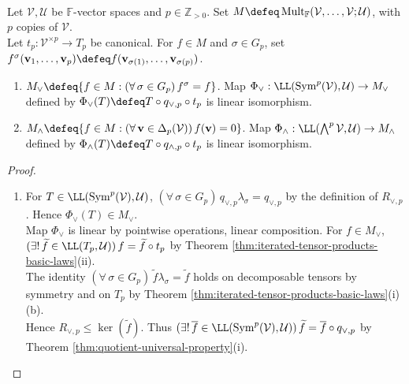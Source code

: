 \begin{theorem} \label{thm:symmetric-exterior-universal-properties} \\
Let $\mathcal{V},\mathcal{U}$ be $\mathbb{F}$-vector spaces and $p\in\mathbb{Z}_{>0}$. Set $M\defeq\operatorname{Mult}_{\mathbb{F}}(\mathcal{V},\ldots,\mathcal{V};\mathcal{U})$, with $p$ copies of $\mathcal{V}$.\\
Let $t_p:\mathcal{V}^{\times p}\to T_p$ be canonical. For $f\in M$ and $\sigma\in G_p$, set $f^\sigma(\mathbf{v}_1,\ldots,\mathbf{v}_p)\defeq f(\mathbf{v}_{\sigma(1)},\ldots,\mathbf{v}_{\sigma(p)})$.
\begin{enumerate}[label=(\roman*)]
\setlength{\itemsep}{0pt}
\item $M_{\vee}\defeq\{f\in M:(\forall\,\sigma\in G_p)\,f^\sigma=f\}$. Map $\Phi_{\vee}:\LL(\operatorname{Sym}^{p}(\mathcal{V}),\mathcal{U})\to M_{\vee}$ defined by $\Phi_{\vee}(T)\defeq T\circ q_{\vee,p}\circ t_p$ is linear isomorphism.
\item $M_{\wedge}\defeq\{f\in M:(\forall\,\mathbf{v}\in\Delta_p(\mathcal{V}))\,f(\mathbf{v})=0\}$. Map $\Phi_{\wedge}:\LL(\bigwedge^{p}\mathcal{V},\mathcal{U})\to M_{\wedge}$ defined by $\Phi_{\wedge}(T)\defeq T\circ q_{\wedge,p}\circ t_p$ is linear isomorphism.
\end{enumerate}
\begin{proof}
\begin{enumerate}[label=(\roman*)]
\setlength{\itemsep}{0pt}
\item For $T\in\LL(\operatorname{Sym}^{p}(\mathcal{V}),\mathcal{U})$, $(\forall\,\sigma\in G_p)\,q_{\vee,p}\lambda_{\sigma}=q_{\vee,p}$ by the definition of $R_{\vee,p}$. Hence $\Phi_{\vee}(T)\in M_{\vee}$.\\
Map $\Phi_{\vee}$ is linear by pointwise operations, linear composition. For $f\in M_{\vee}$, $(\exists!\,\widetilde{f}\in\LL(T_p,\mathcal{U}))\,f=\widetilde{f}\circ t_p$ by Theorem \ref{thm:iterated-tensor-products-basic-laws}(ii).\\
The identity $(\forall\,\sigma\in G_p)\,\widetilde{f}\lambda_{\sigma}=\widetilde{f}$ holds on decomposable tensors by symmetry and on $T_p$ by Theorem \ref{thm:iterated-tensor-products-basic-laws}(i)(b).\\
Hence $R_{\vee,p}\leq\ker(\widetilde{f})$. Thus $(\exists!\,\overline{f}\in\LL(\operatorname{Sym}^{p}(\mathcal{V}),\mathcal{U}))\,\widetilde{f}=\overline{f}\circ q_{\vee,p}$ by Theorem \ref{thm:quotient-universal-property}(i).\\

\end{enumerate}
\end{proof}
\end{theorem}
